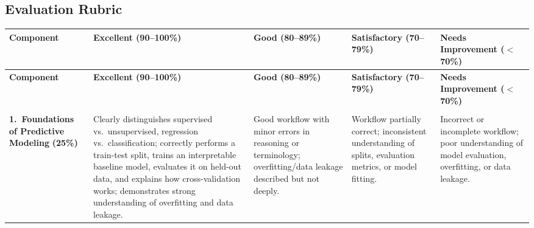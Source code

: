\begin{landscape}

    \section{Evaluation Rubric}

    {\footnotesize

    \begin{longtable}{%
        >{\RaggedRight\arraybackslash}p{2.5cm}   %
        >{\RaggedRight\arraybackslash}p{4.5cm}   %
        >{\RaggedRight\arraybackslash}p{4.2cm}   %
        >{\RaggedRight\arraybackslash}p{4.2cm}   %
        >{\RaggedRight\arraybackslash}p{4.5cm}}  %

    \toprule
    \textbf{Component} &
    \textbf{Excellent (90--100\%)} &
    \textbf{Good (80--89\%)} &
    \textbf{Satisfactory (70--79\%)} &
    \textbf{Needs Improvement ($<$70\%)} \\
    \midrule
    \endfirsthead

    \toprule
    \textbf{Component} &
    \textbf{Excellent (90--100\%)} &
    \textbf{Good (80--89\%)} &
    \textbf{Satisfactory (70--79\%)} &
    \textbf{Needs Improvement ($<$70\%)} \\
    \midrule
    \endhead

    \midrule
    \multicolumn{5}{r}{\textit{Continued on next page}} \\
    \endfoot

    \bottomrule
    \endlastfoot

    \textbf{1.\ Foundations of Predictive Modeling}
    \newline\textbf{(25\%)}
    &
    Clearly distinguishes supervised vs.\ unsupervised, regression
    vs.\ classification; correctly performs a train-test split, trains an
    interpretable baseline model, evaluates it on held-out data, and explains
    how cross-validation works; demonstrates strong understanding of
    overfitting and data leakage.
    &
    Good workflow with minor errors in reasoning or terminology;
    overfitting/data leakage described but not deeply.
    &
    Workflow partially correct; inconsistent understanding of splits,
    evaluation metrics, or model fitting.
    &
    Incorrect or incomplete workflow; poor understanding of model evaluation,
    overfitting, or data leakage.
    \\
    \midrule


\end{longtable}}
\end{landscape}
